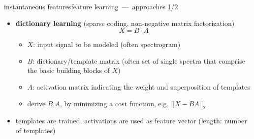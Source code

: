         \begin{frame}{instantaneous features}{feature learning~---~approaches 1/2}
            \begin{itemize}
                \item   \textbf{dictionary learning} (sparse coding, non-negative matrix factorization)
                    \begin{equation*}
                        X = B\cdot A
                    \end{equation*}
                    \begin{itemize}
                        \item[]   $X$: input signal to be modeled (often spectrogram)
                        \item[]   $B$: dictionary/template matrix (often set of single spectra that comprise the basic building blocks of $X$)
                        \item[]   $A$: activation matrix indicating the weight and superposition of templates 
                    \end{itemize}
                    \begin{itemize}
                        \item   derive $B$,$A$, by minimizing a cost function, e.g. $||X-BA||_2$
                    \end{itemize}
                \item<2->[$\rightarrow$] templates are trained, activations are used as feature vector (length: number of templates)
            \end{itemize}
		\end{frame}
